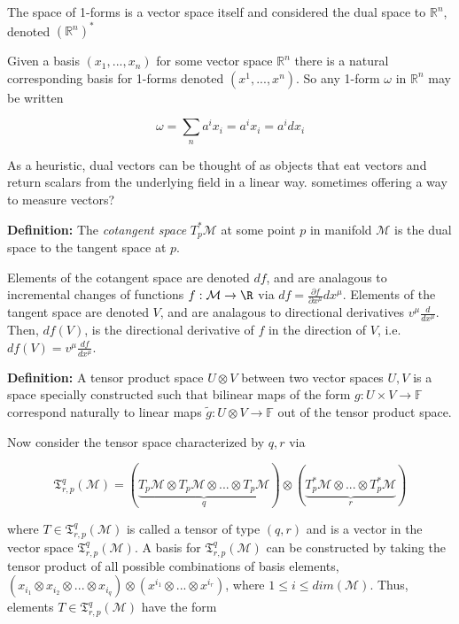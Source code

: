 \documentclass{article}\usepackage[]{graphicx}\usepackage[]{color}
\newcommand{\Rn}{\mathbb{R}^n}
\newcommand{\M}{\mathcal{M}}
\begin{document}
The space of 1-forms is a vector space itself and considered the dual space to $\mathbb{R}^n$, denoted $(\mathbb{R}^n)^*$

Given a basis $(x_1,...,x_n)$ for some vector space $\Rn$ there is a natural corresponding basis for 1-forms denoted $(x^1,...,x^n)$. So any 1-form $\omega$ in $\Rn$ may be written 



$$
\omega=\sum_n a^i x_i=a^i x_i=a^idx_i
$$

As a heuristic, dual vectors can be thought of as objects that eat vectors and return scalars from the underlying field in a linear way. sometimes offering a way to measure vectors?

\begin{center}

\end{center}

\textbf{Definition:} The \textit{cotangent space} $T^*_p\M$ at some point $p$ in manifold $\M$ is the dual space to the tangent space at $p$. 




Elements of the cotangent space are denoted $df$, and are analagous to incremental changes of functions $f:\M\rightarrow\R$ via $df=\frac{\partial f}{\partial x^{\mu}}dx^{\mu}$. Elements of the tangent space are denoted $V$, and are analagous to directional derivatives $v^{\mu}\frac{d}{dx^{\mu}}$. Then, $df(V)$, is the directional derivative of $f$ in the direction of $V$, i.e. $df(V)=v^{\mu}\frac{df}{dx^{\mu}}$.




\textbf{Definition:} A tensor product space $U\otimes V$ between two vector spaces $ U,V $ is a space specially constructed such that bilinear maps of the form $g:U\times V\rightarrow\mathbb{F}$ correspond naturally to linear maps $\tilde{g}:U\otimes V\rightarrow\mathbb{F}$ out of the tensor product space.  
 
Now consider the tensor space characterized by $q,r$ via

$$
\mathfrak{T}^q_{r,p}(\M )= (\underbrace{ T_p\M\otimes T_p\M\otimes ... \otimes T_p\M }_q)\otimes (
\underbrace{T_p^*\M\otimes ...\otimes T^*_p\M }_r)
$$

where $T\in\mathfrak{T}^q_{r,p}(\M )$ is called a tensor of type $(q,r)$ and is a vector in the vector space $\mathfrak{T}^q_{r,p}(\M )$. A basis for $\mathfrak{T}^q_{r,p}(\M )$ can be constructed by taking the tensor product of all possible combinations of basis elements, $(x_{i_{1}}\otimes x_{i_{2}}\otimes ... \otimes x_{i_{q}})\otimes (x^{i_{1}}\otimes ... \otimes x^{i_{r}})$, where $1\leq i\leq dim(\M )$. Thus, elements $T\in\mathfrak{T}^q_{r,p}(\M )$ have the form 
\end{document}
